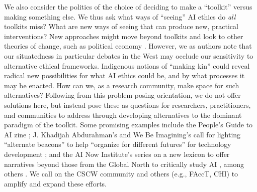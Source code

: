 \documentclass[acmsmall]{acmart}
\begin{document}



We also consider the politics of the choice of deciding to make a ``toolkit'' versus making something else. We thus ask what ways of ``seeing'' AI ethics do \textit{all} toolkits miss? What are new ways of seeing that can produce new, practical interventions? New approaches might move beyond toolkits and look to other theories of change, such as political economy \cite{stark2021critical}.  %
However, we as authors note that our situatedness in particular debates in the West may occlude our sensitivity to alternative ethical frameworks. 
Indigenous notions of ``making kin'' \cite{lewis2018making} could reveal radical new possibilities for what AI ethics could be, and by what processes it may be enacted.
How can we, as a research community, make space for such alternatives?
Following from this problem-posing orientation, we do not offer solutions here, but instead pose these as questions for researchers, practitioners, and communities to address through developing alternatives to the dominant paradigm of the toolkit. Some promising examples include the People's Guide to AI zine \cite{Onuoha2018PeoplesGuideAI}; %
J. Khadijah Abdurahman's and We Be Imagining's call for lighting ``alternate beacons'' to help ``organize for different futures'' for technology development \cite{Abdurahman2021Body}; %
and the AI Now Institute's series on a new lexicon to offer narratives beyond those from the Global North to critically study AI  \cite{Raval2021NewAILexicon}, among others \cite[e.g.,][]{bray2022radical}. %
We call on the CSCW community and others (e.g., FAccT, CHI) to amplify and expand these efforts. 
\end{document}

